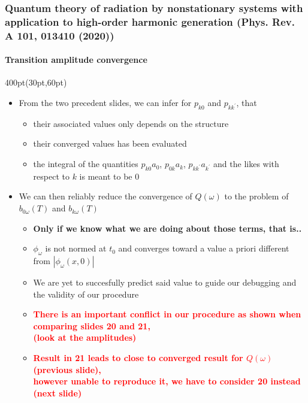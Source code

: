 \begin{frame}
\frametitle{Quantum theory of radiation by nonstationary systems 
        with application to high-order harmonic generation
        (Phys. Rev. A 101, 013410 (2020))}
        \framesubtitle{Transition amplitude convergence}

\begin{textblock*}{400pt}(30pt,60pt)
\small

\begin{itemize}
\footnotesize
\item From the two precedent slides, we can infer for 
$p_{k0}$ and $p_{kk^\prime}$, that
\begin{itemize}
\footnotesize
\item[$\bullet$] their associated values only depends on the structure
\item[$\bullet$] their converged values has been evaluated 
\item[$\bullet$] the integral of the quantities 
$p_{k0}a_0$, 
$p_{0k}a_k$,
$p_{kk^\prime}a_{k^\prime}$ 
and the likes with respect to $k$ is meant to be 0
\end{itemize}
\item We can then reliably reduce the convergence of 
$Q(\omega)$ to the problem of $b_{0\omega}(T)$ and $b_{k\omega}(T)$ 
\begin{itemize}
\footnotesize
\item[$\bullet$] \textbf{Only if we know what we are doing about those terms, that is..}
\item[$\bullet$] $\phi_{\omega}$ is not normed at $t_0$ and converges toward 
a value a priori different from $|\phi_\omega(x,0)|$
\item[$\bullet$] We are yet to succesfully predict said value to guide
our debugging and the validity of our procedure
\item[$\bullet$] \textcolor{red}{\textbf {There is an important conflict 
in our procedure as shown when comparing slides 20 and 21, \\
(look at the amplitudes)}}
\item[$\bullet$] \textcolor{red}{\textbf {Result in 21 leads to close to 
converged result for $Q(\omega)$ (previous slide), \\ 
however unable to reproduce it, we have to consider 20 instead (next slide) }} 
\end{itemize}
\end{itemize}
\end{textblock*}




\end{frame}

